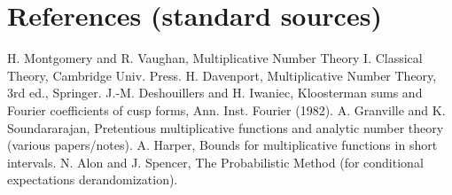 \documentclass[11pt]{article}
\theoremstyle{definition}
\theoremstyle{remark}
\numberwithin{equation}{part}
\begin{document}
\section*{References (standard sources)}
H. Montgomery and R. Vaughan, Multiplicative Number Theory I. Classical Theory, Cambridge Univ. Press.
H. Davenport, Multiplicative Number Theory, 3rd ed., Springer.
J.-M. Deshouillers and H. Iwaniec, Kloosterman sums and Fourier coefficients of cusp forms, Ann. Inst. Fourier (1982).
A. Granville and K. Soundararajan, Pretentious multiplicative functions and analytic number theory (various papers/notes).
A. Harper, Bounds for multiplicative functions in short intervals.
N. Alon and J. Spencer, The Probabilistic Method (for conditional expectations derandomization).


\end{document}
